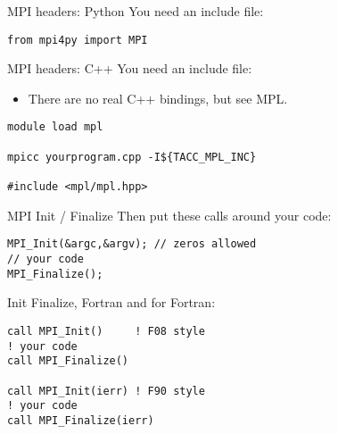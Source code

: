 \begin{python}
\begin{numberedframe}{MPI headers: Python}
\label{sl:mpi-header-p}
You need an include file:
\begin{verbatim}
from mpi4py import MPI
\end{verbatim}
\end{numberedframe}
\end{python}

\begin{numberedframe}{MPI headers: C++}
\label{sl:mpi-header-cpp}
You need an include file:
\begin{itemize}
\item There are no real C++ bindings, but see MPL.
\end{itemize}
\begin{verbatim}
module load mpl

mpicc yourprogram.cpp -I${TACC_MPL_INC}

#include <mpl/mpl.hpp>
\end{verbatim}
\end{numberedframe}

\begin{numberedframe}{MPI Init / Finalize}
Then put these calls around your code:
\lstset{language=C}
\begin{lstlisting}
MPI_Init(&argc,&argv); // zeros allowed
// your code
MPI_Finalize();  
\end{lstlisting}
\end{numberedframe}

\begin{fortran}
\begin{numberedframe}{Init Finalize, Fortran}
and for Fortran:
\lstset{language=Fortran}
\begin{lstlisting}
call MPI_Init()     ! F08 style
! your code
call MPI_Finalize()

call MPI_Init(ierr) ! F90 style
! your code
call MPI_Finalize(ierr)
\end{lstlisting}  
\end{numberedframe}
\end{fortran}


